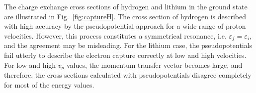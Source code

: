 \documentclass[10pt]{article}
\begin{document}
The charge exchange cross sections of hydrogen and lithium in the 
ground state are illustrated in Fig.~\ref{fig:captureH}. The cross 
section of hydrogen is described with high accuracy by the 
pseudopotential approach for a wide range of proton velocities. 
However, this process constitutes a symmetrical resonance, i.e. 
$\varepsilon_{\!f}=\varepsilon_{\!i}$, and the agreement may be 
misleading. For the lithium case, the pseudopotentials fail utterly 
to describe the electron capture correctly at low and high velocities.
For low and high $v_p$ values, the momentum transfer vector becomes 
large, and therefore, the cross sections calculated with 
pseudopotentials disagree completely for most of the energy values.
\end{document}
